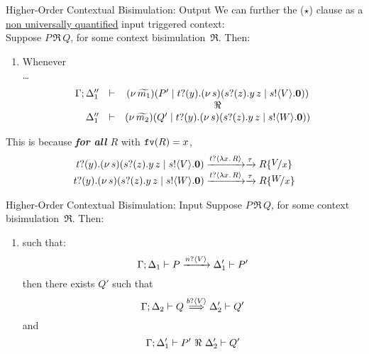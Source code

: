 \documentclass{beamer}
\begin{document}
	\begin{frame}{Higher-Order Contextual Bisimulation: Output}
		We can further the {\color{blue} ($\star$)} clause as a \underline{non universally quantified} input triggered context:
		\\[2mm]

		Suppose $P \,\Re\, Q$, for some context bisimulation~$\Re$. Then:
		\begin{enumerate}[$(\star)$]
			\item	Whenever\\
				\dots
				\[
					\begin{array}{rcc}
						\Gamma; \Delta_1'' &\vdash& (\nu\, \widetilde{m_1})(P' \;|\; t ? (y) .(\nu\, s)(s ? (z) . y\, {z} \;|\; s ! \langle V \rangle . \mathbf{0}))
						\\
						&& \Re
						\\
						\Delta_1'' &\vdash& (\nu\, \widetilde{m_2})(Q' \;|\; t ? (y) .(\nu\, s)(s ? (z) . y\, {z} \;|\; s ! \langle W \rangle . \mathbf{0}))
					\end{array}
				\]
		\end{enumerate}

		This is because \emph{\textbf{for all} $R$} with $\mathtt{fv}(R)=x$, 
		\[
			\begin{array}{c}
			\binp{t}{y}\newsp{s}{\binp{s}{z} \appl{y}{z} \Par \bout{s}{V} \inact}
			\by{\bactinp{t}{\abs{x}{R}}} \by{\tau}
			R \subst{V}{x}
			\\
			\binp{t}{y}\newsp{s}{\binp{s}{z} \appl{y}{z} \Par \bout{s}{W} \inact}
			\by{\bactinp{t}{\abs{x}{R}}} \by{\tau}
			R \subst{W}{x}
			\end{array}
		\]
	\end{frame}

	\begin{frame}{Higher-Order Contextual Bisimulation: Input}
		Suppose $P \,\Re\, Q$, for some context bisimulation~$\Re$. Then:
		\begin{enumerate}[$(\bullet)$]
			\item	{} such that:
				\[
					\Gamma; \Delta_1 \vdash P \xrightarrow{n ? \langle V \rangle} \Delta_1' \vdash P'
				\]
				then there exists $Q'$ such that
				\[
					\Gamma; \Delta_2 \vdash Q \stackrel{b ? \langle V \rangle}{\Longrightarrow} \Delta_2' \vdash Q'
				\]
				and
				\[
					\Gamma; \Delta_1' \vdash P'\ \Re\ \Delta_2' \vdash Q'
				\]
		\end{enumerate}
	\end{frame}
\end{document}

